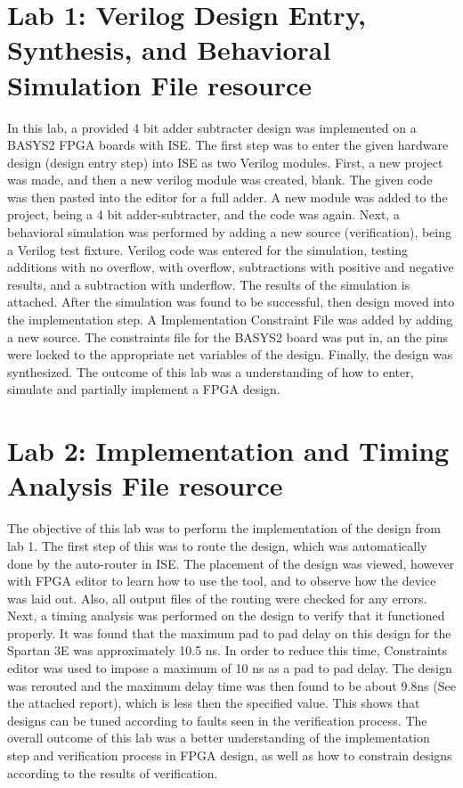 \documentclass[12pt]{article}
\begin{document}
\section{Lab 1: Verilog Design Entry, Synthesis, and Behavioral Simulation File resource}
In this lab, a provided 4 bit adder subtracter design was implemented on a BASYS2 FPGA boards with ISE. The first step was to enter the given hardware design (design entry step) into ISE as two Verilog modules. First, a new project was made, and then a new verilog module was created, blank. The given code was then pasted into the editor for a full adder. A new module was added to the project, being a 4 bit adder-subtracter, and the code was again. Next, a behavioral simulation was performed by adding a new source (verification), being a Verilog test fixture. Verilog code was entered for the simulation, testing additions with no overflow, with overflow, subtractions with positive and negative results, and a subtraction with underflow. The results of the simulation is attached. After the simulation was found to be successful, then design moved into the implementation step. A Implementation Constraint File was added by adding a new source. The constraints file for the BASYS2 board was put in, an the pins were locked to the appropriate net variables of the design. Finally, the design was synthesized. The outcome of this lab was a understanding of how to enter, simulate and partially implement a FPGA design.
\section{Lab 2: Implementation and Timing Analysis File resource}
The objective of this lab was to perform the implementation of the design from lab 1. The first step of this was to route the design, which was automatically done by the auto-router in ISE. The placement of the design was viewed, however with FPGA editor to learn how to use the tool, and to observe how the device was laid out. Also, all output files of the routing were checked for any errors. Next, a timing analysis was performed on the design to verify that it functioned properly. It was found that the maximum pad to pad delay on this design for the Spartan 3E was approximately 10.5 ns. In order to reduce this time, Constraints editor was used to impose a maximum of 10 ns as a pad to pad delay. The design was rerouted and the maximum delay time was then found to be about 9.8ns (See the attached report), which is less then the specified value. This shows that designs can be tuned according to faults seen in the verification process. The overall outcome of this lab was a better understanding of the implementation step and verification process in FPGA design, as well as how to constrain designs according to the results of verification.
\end{document}
